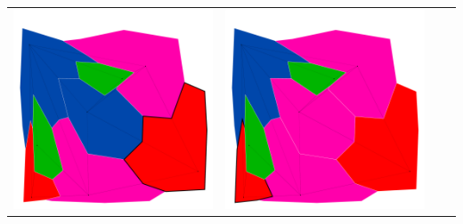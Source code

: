 \documentclass[10pt,a4paper]{article}
\begin{document}
\begin{tabular}{c c c c }
	\includegraphics[scale=.10]{../results/min_conflicts/map_build/minconf_I00005.pdf}&
	\includegraphics[scale=.10]{../results/min_conflicts/map_build/minconf_I00006.pdf}&

\end{tabular}
\end{document}
